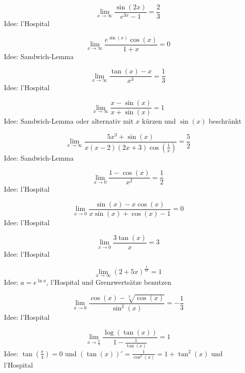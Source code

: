 \documentclass[parskip=full]{scrartcl}
\begin{document}
\begin{displaymath}
  \lim_{x \to \infty} \frac{\sin(2x)}{e^{3x} - 1} = \frac{2}{3}
\end{displaymath}
Idee: l'Hospital

\begin{displaymath}
  \lim_{x \to \infty} \frac{e^{\sin(x)}\cos(x)}{1+x} = 0
\end{displaymath}
Idee: Sandwich-Lemma

\begin{displaymath}
  \lim_{x \to \infty} \frac{\tan(x)-x}{x^3} = \frac{1}{3}
\end{displaymath}
Idee: l'Hospital

\begin{displaymath}
  \lim_{x \to \infty} \frac{x-\sin(x)}{x + \sin(x)} = 1
\end{displaymath}
Idee: Sandwich-Lemma oder alternativ mit $x$ kürzen und $\sin(x)$ beschränkt

\begin{displaymath}
  \lim_{x \to \infty} \frac{5x^3 +\sin(x)}{x(x-2)(2x+3)\cos\left(\frac{1}{x}\right)} = \frac{5}{2}
\end{displaymath}
Idee: Sandwich-Lemma

\begin{displaymath}
  \lim_{x \to 0} \frac{1 - \cos(x)}{x^2} = \frac{1}{2}
\end{displaymath}
Idee: l'Hospital

\begin{displaymath}
  \lim_{x \to 0} \frac{\sin(x) - x\cos(x)}{x\sin(x)+\cos(x) - 1} = 0
\end{displaymath}
Idee: l'Hospital

\begin{displaymath}
  \lim_{x \to 0} \frac{3 \tan(x)}{x} = 3
\end{displaymath}
Idee: l'Hospital

\begin{displaymath}
  \lim_{x \to \infty} \left(2+5x\right)^{\frac{1}{4x}} = 1
\end{displaymath}
Idee: $a = e^{\ln a}$, l'Hospital und Grenzwertsätze benutzen

\begin{displaymath}
  \lim_{x \to 0} \frac{\cos(x) - \sqrt[3]{\cos(x)}}{\sin^2(x)} = -\frac{1}{3}
\end{displaymath}
Idee: l'Hospital

\begin{displaymath}
  \lim_{x \to \frac{\pi}{4}} \frac{\log(\tan(x))}{1 - \frac{1}{\tan(x)}} = 1
\end{displaymath}
Idee: $\tan\left(\frac{\pi}{4}\right) = 0$ und $(\tan(x))' = \frac{1}{\cos^2(x)} = 1 + \tan^2(x)$ und l'Hospital
\end{document}
